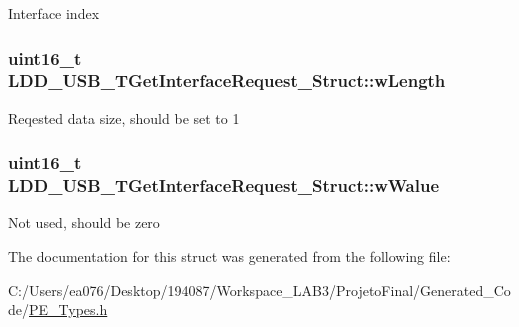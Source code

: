 Interface index \hypertarget{struct_l_d_d___u_s_b___t_get_interface_request___struct_a2aa1550fc5e72002a94c74ea0957ec74}{
\subsubsection[{w\-Length}]{\setlength{\rightskip}{0pt plus 5cm}uint16\-\_\-t L\-D\-D\-\_\-\-U\-S\-B\-\_\-\-T\-Get\-Interface\-Request\-\_\-\-Struct\-::w\-Length}}\label{struct_l_d_d___u_s_b___t_get_interface_request___struct_a2aa1550fc5e72002a94c74ea0957ec74}
Reqested data size, should be set to 1 \hypertarget{struct_l_d_d___u_s_b___t_get_interface_request___struct_a48bcaf6af044e3e9669f5ea634a2b9fe}{
\subsubsection[{w\-Walue}]{\setlength{\rightskip}{0pt plus 5cm}uint16\-\_\-t L\-D\-D\-\_\-\-U\-S\-B\-\_\-\-T\-Get\-Interface\-Request\-\_\-\-Struct\-::w\-Walue}}\label{struct_l_d_d___u_s_b___t_get_interface_request___struct_a48bcaf6af044e3e9669f5ea634a2b9fe}
Not used, should be zero 

The documentation for this struct was generated from the following file\-:\begin{DoxyCompactItemize}
\item 
C\-:/\-Users/ea076/\-Desktop/194087/\-Workspace\-\_\-\-L\-A\-B3/\-Projeto\-Final/\-Generated\-\_\-\-Code/\hyperlink{_p_e___types_8h}{P\-E\-\_\-\-Types.\-h}\end{DoxyCompactItemize}
